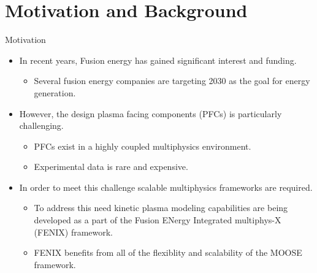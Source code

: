 \documentclass[aspectratio=169, 16pt]{beamer}
\begin{document}
\section{Motivation and Background}
\begin{frame}{Motivation}
  \vfill{}
  \begin{itemize}
    \item In recent years, Fusion energy has gained significant interest and funding.
    \begin{itemize}
      \item Several fusion energy companies are targeting 2030 as the goal for energy generation.
    \end{itemize}
    \item However, the design plasma facing components (PFCs) is particularly challenging.
    \begin{itemize}
      \item PFCs exist in a highly coupled multiphysics environment.
      \item Experimental data is rare and expensive.
    \end{itemize}
    \item In order to meet this challenge scalable multiphysics frameworks are required\cite{carter2020powering}.
    \begin{itemize}
      \item To address this need kinetic plasma modeling capabilities are being developed as a part of the Fusion ENergy Integrated multiphys-X (FENIX) framework.
      \item FENIX benefits from all of the flexiblity and scalability of the MOOSE framework.
    \end{itemize}
  \end{itemize}
\end{frame}
\end{document}
